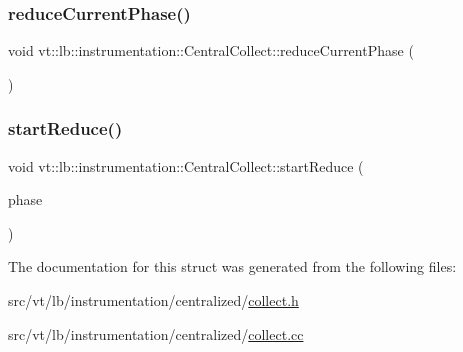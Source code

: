 \subsubsection{\texorpdfstring{reduce\+Current\+Phase()}{reduceCurrentPhase()}}
{\footnotesize\ttfamily void vt\+::lb\+::instrumentation\+::\+Central\+Collect\+::reduce\+Current\+Phase (\begin{DoxyParamCaption}{ }\end{DoxyParamCaption})\hspace{0.3cm}{\ttfamily [static]}}

\mbox{\label{structvt_1_1lb_1_1instrumentation_1_1_central_collect_a1b5d16c13976ea4c6db0275ef3ff35d8}} 
\subsubsection{\texorpdfstring{start\+Reduce()}{startReduce()}}
{\footnotesize\ttfamily void vt\+::lb\+::instrumentation\+::\+Central\+Collect\+::start\+Reduce (\begin{DoxyParamCaption}\item[{\hyperlink{namespacevt_a5505d0bab25ce2ff566a8e015871b379}{L\+B\+Phase\+Type} const \&}]{phase }\end{DoxyParamCaption})\hspace{0.3cm}{\ttfamily [static]}}



The documentation for this struct was generated from the following files\+:\begin{DoxyCompactItemize}
\item 
src/vt/lb/instrumentation/centralized/\hyperlink{collect_8h}{collect.\+h}\item 
src/vt/lb/instrumentation/centralized/\hyperlink{collect_8cc}{collect.\+cc}\end{DoxyCompactItemize}
